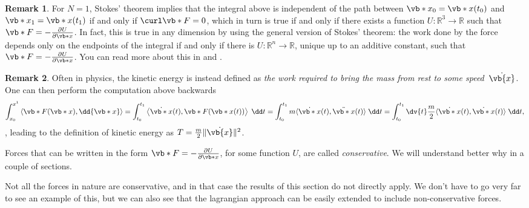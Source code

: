 \documentclass[english,fontsize=11pt,paper=b5]{scrbook}
\numberwithin{equation}{chapter}
\theoremstyle{definition}
\newtheorem{remark}{Remark}[chapter]
\begin{document}
    \begin{remark}
      For $N=1$, Stokes' theorem implies that the integral above is independent of the path between $\vb*{x}_0 = \vb*{x}(t_0)$ and $\vb*{x}_1 = \vb*{x}(t_1)$ if and only if $\curl \vb*{F} = 0$, which in turn is true if and only if there exists a function $U:\mathbb{R}^3\to\mathbb{R}$ such that $\vb*{F} = -\frac{\partial U}{\partial \vb*{x}}$.
      In fact, this is true in any dimension by using the general version of Stokes' theorem: the work done by the force depends only on the endpoints of the integral if and only if there is $U:\mathbb{R}^n\to\mathbb{R}$, unique up to an additive constant, such that $\vb*{F} = -\frac{\partial U}{\partial \vb*{x}}$.
      You can read more about this in \cite[Chapter 2.5]{book:arnold} and \cite[Theorem 6.3 and 8.1]{book:knauf}.
    \end{remark}


    \begin{remark}
      Often in physics, the kinetic energy is instead defined as \emph{the work required to bring the mass from rest to some speed~$\dot{\vb{x}}$}.
      One can then perform the computation above backwards
      \begin{equation}
        \int_{x_0}^{x^1} \left\langle\vb*{F}(\vb*{x}), \dd{\vb*{x}}\right\rangle
        = \int_{t_0}^{t_1} \left\langle\dot{\vb*{x}}(t), \vb*{F}(\vb*{x}(t))\right\rangle\; \dd t
        = \int_{t_0}^{t_1} m \langle\dot{\vb*{x}}(t), \ddot{\vb*{x}}(t)\rangle\; \dd t
        = \int_{t_0}^{t_1} \dv{t} \frac{m}{2} \langle\dot{\vb*{x}}(t), \dot{\vb*{x}}(t)\rangle \; \dd t,
      \end{equation},
      leading to the definition of kinetic energy as $T = \frac{m}{2} \|\dot{\vb{x}}\|^2$.
    \end{remark}

    Forces that can be written in the form $\vb*{F} = -\frac{\partial U}{\partial \vb*{x}}$, for some function $U$, are called \emph{conservative}.
    We will understand better why in a couple of sections.

    Not all the forces in nature are conservative, and in that case the results of this section do not directly apply.
    We don't have to go very far to see an example of this, but we can also see that the lagrangian approach can be easily extended to include non-conservative forces.
\end{document}
